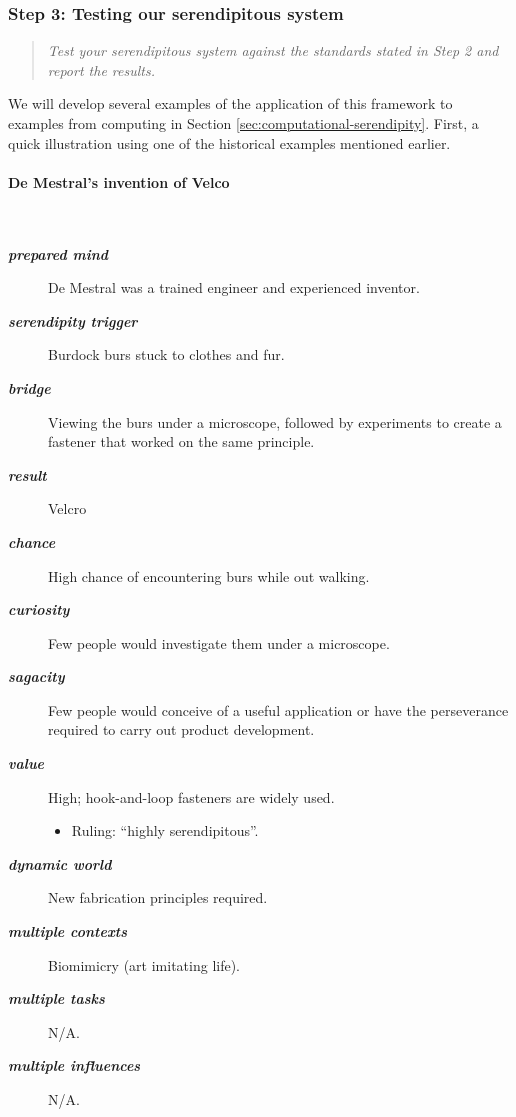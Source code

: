 \subsubsection*{Step 3: Testing our serendipitous system}

\begin{quote} {\em Test your serendipitous system against the standards stated in Step 2 and report the
results.}\end{quote}

We will develop several examples of the application of this framework
to examples from computing in Section
\ref{sec:computational-serendipity}.  First, a quick illustration
using one of the historical examples mentioned earlier.

\begin{mdframed}
\vspace{-.35cm}
\paragraph{De Mestral's invention of Velco\texttrademark}~\\[.05cm]
\begin{description}
\item[\emph{\textbf{prepared mind}}] De Mestral was a trained engineer and experienced inventor.
\item[\emph{\textbf{serendipity trigger}}] Burdock burs stuck to clothes and fur.
\item[\emph{\textbf{bridge}}] Viewing the burs under a microscope, followed by experiments to create a fastener that worked on the same principle.
\item[\emph{\textbf{result}}] Velcro\texttrademark
\item[\emph{\textbf{chance}}] High chance of encountering burs while out walking.
\item[\emph{\textbf{curiosity}}] Few people would investigate them under a microscope.
\item[\emph{\textbf{sagacity}}] Few people would conceive of a useful application or have the perseverance required to carry out product development.
\item[\emph{\textbf{value}}] High; hook-and-loop fasteners are widely used.
\begin{itemize}
\item Ruling: ``highly serendipitous''.
\end{itemize}
\item[\emph{\textbf{dynamic world}}] New fabrication principles required.
\item[\emph{\textbf{multiple contexts}}] Biomimicry (art imitating life).
\item[\emph{\textbf{multiple tasks}}] N/A.
\item[\emph{\textbf{multiple influences}}] N/A.
\end{description}
\end{mdframed}


